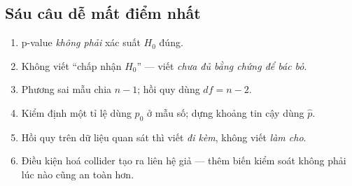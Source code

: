 \documentclass[11pt]{article}
\begin{document}
\subsection*{Sáu câu dễ mất điểm nhất}

\begin{enumerate}
\item p-value \emph{không phải} xác suất $H_0$ đúng.
\item Không viết ``chấp nhận $H_0$'' --- viết \emph{chưa đủ bằng chứng để bác bỏ}.
\item Phương sai mẫu chia $n-1$; hồi quy dùng $df = n-2$.
\item Kiểm định một tỉ lệ dùng $p_0$ ở mẫu số; dựng khoảng tin cậy dùng $\hat p$.
\item Hồi quy trên dữ liệu quan sát thì viết \emph{đi kèm}, không viết \emph{làm cho}.
\item Điều kiện hoá collider tạo ra liên hệ giả --- thêm biến kiểm soát không phải
      lúc nào cũng an toàn hơn.
\end{enumerate}
\end{document}
